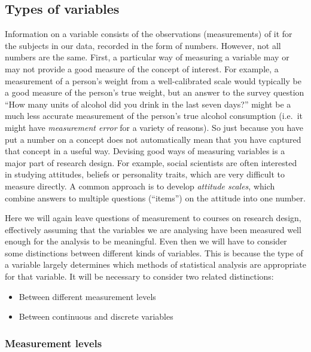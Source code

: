\subsection{Types of variables}
\label{ss_intro_def_vartypes}

Information on a variable consists of the observations
(measurements) of it for the subjects in our data, recorded in the form
of numbers. However, not all numbers are the same. First, a particular
way of measuring a variable may or may not provide a good measure of the
concept of interest. For example, a measurement of a person's weight
from a well-calibrated scale would typically be a good measure
of the person's true weight, but an answer to the survey question ``How many
units of alcohol did you drink in the last seven days?'' might be a much
less accurate measurement of the person's true alcohol consumption (i.e.\
it might have \emph{measurement error} for a variety of reasons). So
just because you have put a number on a concept does not automatically
mean that you have captured that concept in a useful way. Devising good
ways of measuring variables is a major part of research design.
For example, social scientists are often interested in studying
attitudes, beliefs or personality traits, which are very difficult to
measure directly. A common approach is to develop \emph{attitude
scales}, which combine answers to multiple questions (``items'') on the
attitude into one number.

Here we will again leave questions of measurement to courses on research design, effectively assuming that the
variables we are analysing have been measured well enough for the
analysis to be meaningful. Even then we will have to consider some
distinctions between different kinds of variables. This is because the
type of a variable largely determines which methods of statistical analysis are
appropriate for that variable. It will be necessary to consider two related
distinctions:
\begin{itemize}
\item
Between different measurement levels
\item
Between continuous and  discrete variables
\end{itemize}

\subsubsection{Measurement levels}
\label{sss_intro_def_vars_measlevels}

